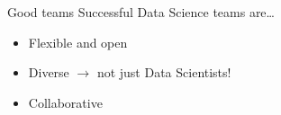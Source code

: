 \begin{frame}{Good teams}
    Successful Data Science teams are\ldots
    \begin{itemize}
        \item Flexible and open
        \item Diverse $\to$ not just Data Scientists!
        \item Collaborative
    \end{itemize}
\end{frame}




